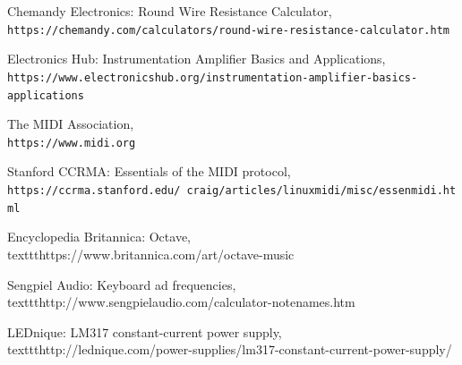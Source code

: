 \documentclass{article}
\begin{document}
\begin{thebibliography}{9}

Chemandy Electronics: Round Wire Resistance Calculator,
\\\texttt{https://chemandy.com/calculators/round-wire-resistance-calculator.htm}

Electronics Hub: Instrumentation Amplifier Basics and Applications,
\\\texttt{https://www.electronicshub.org/instrumentation-amplifier-basics-applications}

The MIDI Association,
\\\texttt{https://www.midi.org}

Stanford CCRMA: Essentials of the MIDI protocol,
\\\texttt{https://ccrma.stanford.edu/~craig/articles/linuxmidi/misc/essenmidi.html}

Encyclopedia Britannica: Octave,
\\texttt{https://www.britannica.com/art/octave-music}

Sengpiel Audio: Keyboard ad frequencies,
\\texttt{http://www.sengpielaudio.com/calculator-notenames.htm}

LEDnique: LM317 constant-current power supply,
\\texttt{http://lednique.com/power-supplies/lm317-constant-current-power-supply/}

\end{thebibliography}
\end{document}
